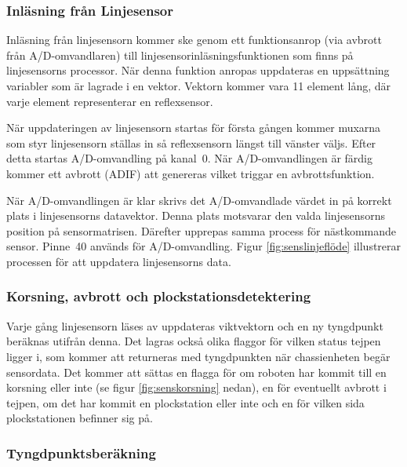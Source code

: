 \subsubsection{Inläsning från Linjesensor}

Inläsning från linjesensorn kommer ske genom ett funktionsanrop (via avbrott från A/D-omvandlaren) till linjesensorinläsningsfunktionen som finns på linjesensorns processor. När denna funktion anropas uppdateras en uppsättning variabler som är lagrade i en vektor. Vektorn kommer vara 11 element lång, där varje element representerar en reflexsensor.

När uppdateringen av linjesensorn startas för första gången kommer muxarna som styr linjesensorn ställas in så reflexsensorn längst till vänster väljs. Efter detta startas A/D-omvandling på kanal~0. När A/D-omvandlingen är färdig kommer ett avbrott (ADIF) att genereras vilket triggar en avbrottsfunktion.

När A/D-omvandlingen är klar skrivs det A/D-omvandlade värdet in på korrekt plats i linjesensorns datavektor. Denna plats motsvarar den valda linjesensorns position på sensormatrisen. Därefter upprepas samma process för nästkommande sensor. Pinne~40 används för A/D-omvandling. Figur \ref{fig:senslinjeflöde} illustrerar processen för att uppdatera linjesensorns data.


\subsubsection{Korsning, avbrott och plockstationsdetektering}

Varje gång linjesensorn läses av uppdateras viktvektorn och en ny tyngdpunkt beräknas utifrån denna. Det lagras också olika flaggor för vilken status tejpen ligger i, som kommer att returneras med tyngdpunkten när chassienheten begär sensordata. Det kommer att sättas en flagga för om roboten har kommit till en korsning eller inte (se figur \ref{fig:senskorsning} nedan), en för eventuellt avbrott i tejpen, om det har kommit en plockstation eller inte och en för vilken sida plockstationen befinner sig på.



\subsubsection{Tyngdpunktsberäkning}

